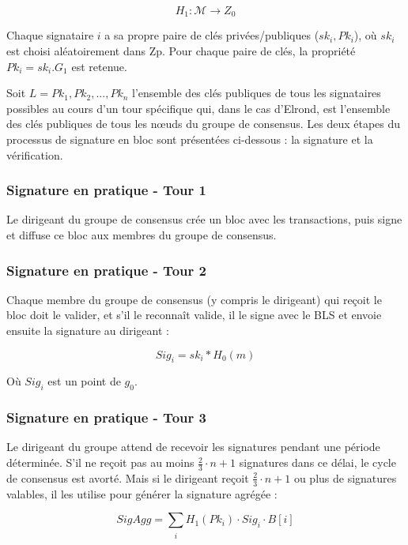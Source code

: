 \documentclass[journal]{IEEEtran}
\begin{document}
\begin{equation}
\label{3}
   {H}_{1} : \mathcal{M} \to {Z}_{0} 
\end{equation}

Chaque signataire $i$ a sa propre paire de clés privées/publiques (${sk}_{i},{Pk}_{i}$), 
où ${sk}_{i}$ est choisi aléatoirement dans Zp. Pour chaque paire de clés, la propriété ${Pk}_{i}={sk}_{i}.{G}_{1}$ est retenue.

Soit $L = {Pk}_{1}, {Pk}_{2}, ..., {Pk}_{n}$  l'ensemble des clés publiques de tous les signataires possibles au cours d'un tour spécifique qui, dans le cas d'Elrond, est l'ensemble des clés publiques de tous les nœuds du groupe de consensus. Les deux étapes du processus de signature en bloc sont présentées ci-dessous : la signature et la vérification.

\subsubsection{Signature en pratique - Tour 1} 
Le dirigeant du groupe de consensus crée un bloc avec les transactions, puis signe et diffuse ce bloc aux membres du groupe de consensus.

\subsubsection{Signature en pratique - Tour 2}
Chaque membre du groupe de consensus (y compris le dirigeant) qui reçoit le bloc doit le valider, et s'il le reconnaît valide, il le signe avec le BLS et envoie ensuite la signature au dirigeant :

\begin{equation}
\label{4}
   {Sig}_{i}  = {sk}_{i} * {H}_{0}(m) 
\end{equation}

Où ${Sig}_{i}$ est un point de ${g}_{0}$.

\subsubsection{Signature en pratique - Tour 3}
Le dirigeant du groupe attend de recevoir les signatures pendant une période déterminée. S'il ne reçoit pas au moins $\frac{2}{3}\cdot n+1$ signatures dans ce délai, le cycle de consensus est avorté. Mais si le dirigeant reçoit $\frac{2}{3}\cdot n+1$ ou plus de signatures valables, il les utilise pour générer la signature agrégée :

\begin{equation}
\label{5}
   SigAgg  = \sum_{\substack{i}}{H}_{1}({Pk}_{i})\cdot    {Sig}_{i}  \cdot  B[i]
\end{equation}
\end{document}
